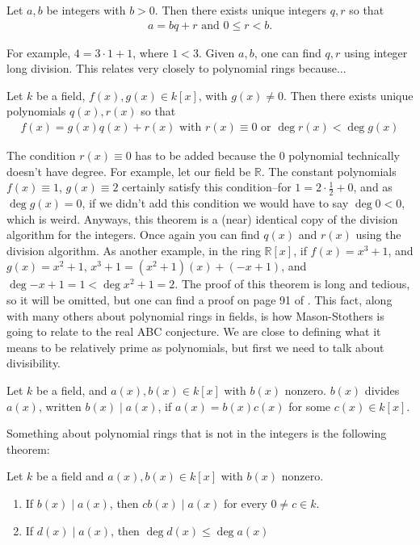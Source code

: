\documentclass[12pt]{article}
\newenvironment{theorem}{\begin{mytheorem}}{\end{mytheorem}}
\theoremstyle{definitionstyle}
\newenvironment{definition}{\begin{mydef}}{\end{mydef}}
\def\mbb#1{\mathbb{#1}}
\def \R{\mbb{R}}
\begin{document}
\begin{theorem}[Division Algorithm]
	Let $a, b$ be integers with $b > 0$. Then there exists unique integers $q, r$ so that 
	\begin{align*}
		a = bq + r \text{ and } 0 \leq r < b.
	\end{align*}
\end{theorem}
For example, $4 = 3 \cdot 1 + 1$, where $1 < 3$. Given $a,b$, one can find $q, r$ using integer long division. This relates very closely to polynomial rings because...

\begin{theorem}[Division Algorithm]	Let $k$ be a field, $f(x), g(x) \in k[x]$, with $g(x) \neq 0$. Then there exists unique polynomials $q(x), r(x)$ so that 
	\begin{align*}
		f(x) = g(x)q(x) + r(x) \text{ with } r(x) \equiv 0 \text{ or } \deg{r(x)} < \deg{g(x)}
	\end{align*}
\end{theorem}
The condition $r(x) \equiv 0$ has to be added because the $0$ polynomial technically doesn't have degree. For example, let our field be $\R$. The constant polynomials $f(x) \equiv 1$, $g(x) \equiv 2$ certainly satisfy this condition--for $1 = 2 \cdot \frac12 + 0$, and as $\deg g(x) = 0$, if we didn't add this condition we would have to say $\deg 0 < 0$, which is weird. Anyways, this theorem is a (near) identical copy of the division algorithm for the integers. Once again you can find $q(x)$ and $r(x)$ using the division algorithm. As another example, in the ring $\R[x]$, if $f(x) = x^3+1$, and $g(x) = x^2+1$, $x^3+1 = (x^2+1)(x) + (-x+1)$, and $\deg{-x+1} = 1 < \deg{x^2+1} = 2$. The proof of this theorem is long and tedious, so it will be omitted, but one can find a proof on page 91 of \cite{hungerford2012abstract}. This fact, along with many others about polynomial rings in fields, is how Mason-Stothers is going to relate to the real ABC conjecture. We are close to defining what it means to be relatively prime as polynomials, but first we need to talk about divisibility.
\begin{definition}
	Let $k$ be a field, and $a(x), b(x) \in k[x]$ with $b(x)$ nonzero. $b(x)$ divides $a(x)$, written $b(x) \mid a(x)$, if $a(x) = b(x)c(x)$ for some $c(x) \in k[x]$.
\end{definition}
Something about polynomial rings that is not in the integers is the following theorem:
\begin{theorem}
	Let $k$ be a field and $a(x), b(x) \in k[x]$ with $b(x)$ nonzero. 
	\begin{enumerate}[label=(\arabic*)]
		\item If $b(x) \mid a(x)$, then $cb(x) \mid a(x)$ for every $0 \neq c \in k$.
		\item If $d(x) \mid a(x)$, then $\deg d(x) \leq \deg a(x)$
	\end{enumerate}
\end{theorem}
\end{document}
